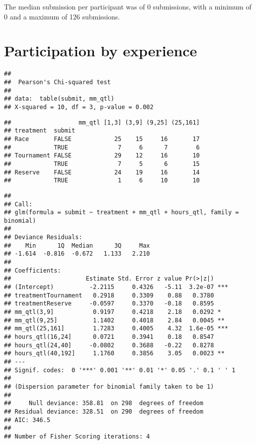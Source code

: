 \documentclass[11pt, titlepage]{article}
\begin{document}
The median submission per participant was of 0 submissions, with a
minimum of 0 and a maximum of 126 submissions.

\section{Participation by experience}\label{participation-by-experience}

\begin{verbatim}
## 
##  Pearson's Chi-squared test
## 
## data:  table(submit, mm_qtl)
## X-squared = 10, df = 3, p-value = 0.002
\end{verbatim}

\begin{verbatim}
##                   mm_qtl [1,3] (3,9] (9,25] (25,161]
## treatment  submit                                   
## Race       FALSE            25    15     16       17
##            TRUE              7     6      7        6
## Tournament FALSE            29    12     16       10
##            TRUE              7     5      6       15
## Reserve    FALSE            24    19     16       14
##            TRUE              1     6     10       10
\end{verbatim}

\begin{verbatim}
## 
## Call:
## glm(formula = submit ~ treatment + mm_qtl + hours_qtl, family = binomial)
## 
## Deviance Residuals: 
##    Min      1Q  Median      3Q     Max  
## -1.614  -0.816  -0.672   1.133   2.210  
## 
## Coefficients:
##                     Estimate Std. Error z value Pr(>|z|)    
## (Intercept)          -2.2115     0.4326   -5.11  3.2e-07 ***
## treatmentTournament   0.2918     0.3309    0.88   0.3780    
## treatmentReserve     -0.0597     0.3370   -0.18   0.8595    
## mm_qtl(3,9]           0.9197     0.4218    2.18   0.0292 *  
## mm_qtl(9,25]          1.1402     0.4018    2.84   0.0045 ** 
## mm_qtl(25,161]        1.7283     0.4005    4.32  1.6e-05 ***
## hours_qtl(16,24]      0.0721     0.3941    0.18   0.8547    
## hours_qtl(24,40]     -0.0802     0.3688   -0.22   0.8278    
## hours_qtl(40,192]     1.1760     0.3856    3.05   0.0023 ** 
## ---
## Signif. codes:  0 '***' 0.001 '**' 0.01 '*' 0.05 '.' 0.1 ' ' 1
## 
## (Dispersion parameter for binomial family taken to be 1)
## 
##     Null deviance: 358.81  on 298  degrees of freedom
## Residual deviance: 328.51  on 290  degrees of freedom
## AIC: 346.5
## 
## Number of Fisher Scoring iterations: 4
\end{verbatim}
\end{document}
